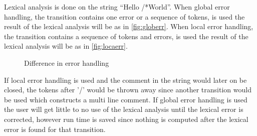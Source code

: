 \begin{example}
Lexical analysis is done on the string ``Hello /*World''. When global error
handling, the transition contains one error or a sequence of tokens, is used the
result of the lexical analysis will be as in \cref{fig:globerr}. When local
error handling, the transition contains a sequence of tokens and errors, is used
the result of the lexical analysis will be as in \cref{fig:locaerr}.

\begin{figure}[!ht]
  \centering
  \hspace{2cm}
  \caption{Difference in error handling}
\end{figure}

If local error handling is used and the comment in the string would later on be
closed, the tokens after '/' would be thrown away since another transition would
be used which constructs a multi line comment.
If global error handling is used the user will get little to no use of the
lexical analysis until the lexical error is corrected, however run time is saved
since nothing is computed after the lexical error is found for that transition.
\end{example}


